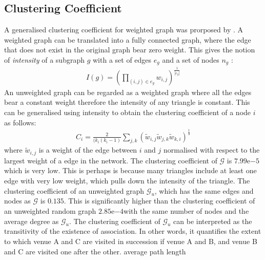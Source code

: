\subsection{Clustering Coefficient}
A generalised clustering coefficient for weighted graph was prorposed by \cite{saramaki2007generalizations}. A weighted graph can be translated into a fully connected graph, where the edge that does not exist in the original graph bear zero weight. This gives the notion of \emph{intensity} of a subgraph $g$ with a set of edges $e_{g}$ and a set of nodes $n_{g}$ \citep{saramaki2007generalizations}:
\begin{align*}
I(g) = \left( \prod_{(i, j)\in e_{g}}^{}w_{i, j} \right)^{\frac{1}{|e_{g}|}}
\end{align*}
An unweighted graph can be regarded as a weighted graph where all the edges bear a constant weight therefore the intensity of any triangle is constant. This can be generalised using intensity to obtain the clustering coefficient of a node $i$ as follows\citep{saramaki2007generalizations}:
\begin{align*}
C_i = \frac{2}{(k_i(k_i-1)}\sum_{j, k}^{}(\widetilde{w}_{i, j}\widetilde{w}_{j, k}\widetilde{w}_{k, i})^{\frac{1}{3}}
\end{align*}
where $\widetilde{w}_{i, j}$ is a weight of the edge between $i$ and $j$ normalised with respect to the largest weight of a edge in the network. 
The clustering coefficient of $\mathcal{G}$ is $7.99\mathrm{e}{-5}$ which is very low. This is perhaps is because many triangles include at least one edge with very low weight, which pulls down the intensity of the triangle.
The clustering coefficient of an unweighted graph $\mathcal{G}_u$, which has the same edges and nodes as $\mathcal{G}$ is $0.135$. This is significantly higher than the clustering coefficient of an unweighted random graph $2.85\mathrm{e}{-4}$with the same number of nodes and the average degree as $\mathcal{G}_u$. The clustering coefficient of  $\mathcal{G}_u$ can be interpreted as the transitivity of the existence of association. In other words, it quantifies the extent to which venue A and C are visited in succession if venue A and B, and venue B and C are visited one after the other.
\color{red}average path length \color{black}